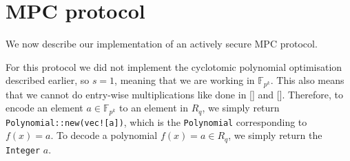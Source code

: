 \documentclass[../main.tex]{subfiles}
\begin{document}
\section{MPC protocol}
We now describe our implementation of an actively secure MPC protocol.

For this protocol we did not implement the cyclotomic polynomial optimisation described earlier, so $s = 1$, meaning that we are working in $\mathbb{F}_{p^k}$.
This also means that we cannot do entry-wise multiplications like done in [] and [].
Therefore, to encode an element $a \in \mathbb{F}_{p^k}$ to an element in $R_q$, we simply return \lstinline{Polynomial::new(vec![a])}, which is the \lstinline{Polynomial} corresponding to $f(x) = a$. To decode a polynomial $f(x) = a \in R_q$, we simply return the \lstinline{Integer} $a$.
\end{document}
